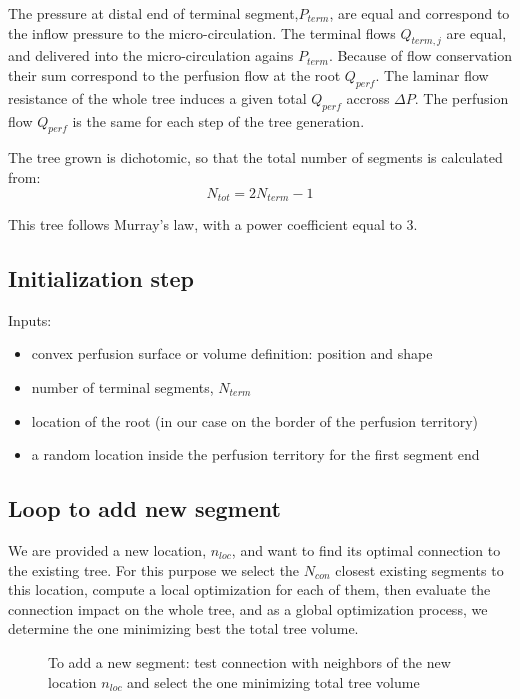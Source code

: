 \documentclass[a4paper, 11pt]{article} %
\begin{document}
\vspace{15pt}

The pressure at distal end of terminal segment,$P_{term}$, are equal and correspond to the inflow pressure to the micro-circulation.
The terminal flows $Q_{term,j}$ are equal, and delivered into the micro-circulation agains $P_{term}$. Because of flow conservation their sum correspond to the perfusion flow at the root $Q_{perf}$. 
The laminar flow resistance of the whole tree induces a given total $Q_{perf}$ accross $\Delta P$. The perfusion flow $Q_{perf}$ is the same for each step of the tree generation.

The tree grown is dichotomic, so that the total number of segments is calculated from:
\begin{equation}
N_{tot} = 2 N_{term} -1
\end{equation}

This tree follows Murray's law, with a power coefficient equal to 3.

\subsection{Initialization step}  
Inputs:
\begin{itemize}
\item convex perfusion surface or volume definition: position and shape
\item number of terminal segments, $N_{term}$
\item location of the root (in our case on the border of the perfusion territory)
\item a random location inside the perfusion territory for the first segment end 
\end{itemize}

\subsection{Loop to add new segment}
We are provided a new location, $n_{loc}$, and want to find its optimal connection to the existing tree. For this purpose we select the $N_{con}$ closest existing segments to this location, compute a local optimization for each of them, then evaluate the connection impact on the whole tree, and as a global optimization process, we determine the one minimizing best the total tree volume.

\begin{figure}[!h]
\centering
{}
\caption{To add a new segment: test connection with neighbors of the new location $n_{loc}$ and select the one minimizing total tree volume}
\label{fig:test neighbors}
\end{figure}
\end{document}
